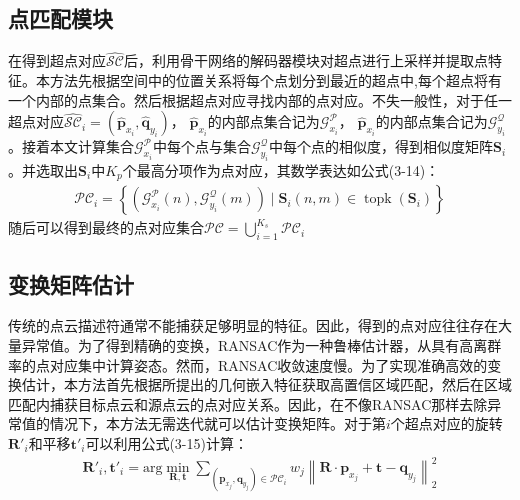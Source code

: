     \subsection{点匹配模块}
    在得到超点对应$\mathcal{\hat{SC}}$后，利用骨干网络的解码器模块对超点进行上采样并提取点特征。本方法先根据空间中的位置关系将每个点划分到最近的超点中,每个超点将有一个内部的点集合。然后根据超点对应寻找内部的点对应。不失一般性，对于任一超点对应$\mathcal{\hat{SC}}_i=(\mathbf{\hat{p}}_{x_{i}}, \mathbf{\hat{q}}_{y_{i}})$， $\mathbf{\hat{p}}_{x_{i}}$的内部点集合记为$\mathcal{G}_{x_i}^{\mathcal{P}}$， $\mathbf{\hat{p}}_{x_{i}}$的内部点集合记为$\mathcal{G}_{y_i}^{\mathcal{Q}}$。接着本文计算集合$\mathcal{G}_{x_i}^{\mathcal{P}}$中每个点与集合$\mathcal{G}_{y_i}^{\mathcal{Q}}$中每个点的相似度，得到相似度矩阵$\mathbf{S}_i$。并选取出$\mathbf{S}_i$中$K_p$个最高分项作为点对应，其数学表达如公式(3-14)：
    \begin{equation}
        \begin{aligned}
        \mathcal{PC}_i=
        \left\{
        (\mathcal{G}_{x_i}^{\mathcal{P}}(n), \mathcal{G}_{y_i}^{\mathcal{Q}}(m)) \mid
        \mathbf{S}_i(n, m) \in \operatorname{topk}({\mathbf{S}_i})
        \right\}
        \end{aligned}
    \end{equation}
    随后可以得到最终的点对应集合$\mathcal{PC} = \bigcup_{i=1}^{K_s} \mathcal{PC}_i$

    \subsection{变换矩阵估计}
    传统的点云描述符通常不能捕获足够明显的特征。因此，得到的点对应往往存在大量异常值。为了得到精确的变换，RANSAC作为一种鲁棒估计器，从具有高离群率的点对应集中计算姿态。然而，RANSAC收敛速度慢。为了实现准确高效的变换估计，本方法首先根据所提出的几何嵌入特征获取高置信区域匹配，然后在区域匹配内捕获目标点云和源点云的点对应关系。因此，在不像RANSAC那样去除异常值的情况下，本方法无需迭代就可以估计变换矩阵。对于第$i$个超点对应的旋转$\mathbf{R'}_i$和平移$\mathbf{t'}_i$可以利用公式(3-15)计算：
    \begin{equation}
        \begin{aligned}
        \mathbf{R'}_i, \mathbf{t'}_i=
        \mathrm{arg}\min_{\mathbf{R},\mathbf{t}} 
        \sum_{(\mathbf{p}_{x_j},\mathbf{q}_{y_j}) \in \mathcal{PC}_i}
        w_{j}
        \left\|
        \mathbf{R}\cdot\mathbf{p}_{x_j}+\mathbf{t}-\mathbf{q}_{y_j}
        \right\|_{2}^{2}
        \end{aligned}
    \end{equation}\par

